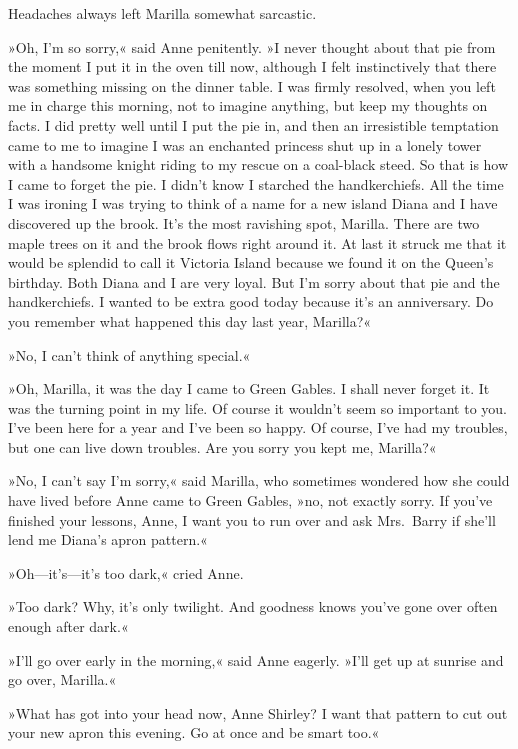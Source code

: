 Headaches always left Marilla somewhat sarcastic.

»Oh, I'm so sorry,« said Anne penitently. »I never thought about that pie from the moment I put it in the oven till now, although I felt instinctively that there was something missing on the dinner table. I was firmly resolved, when you left me in charge this morning, not to imagine anything, but keep my thoughts on facts. I did pretty well until I put the pie in, and then an irresistible temptation came to me to imagine I was an enchanted princess shut up in a lonely tower with a handsome knight riding to my rescue on a coal-black steed. So that is how I came to forget the pie. I didn't know I starched the handkerchiefs. All the time I was ironing I was trying to think of a name for a new island Diana and I have discovered up the brook. It's the most ravishing spot, Marilla. There are two maple trees on it and the brook flows right around it. At last it struck me that it would be splendid to call it Victoria Island because we found it on the Queen's birthday. Both Diana and I are very loyal. But I'm sorry about that pie and the handkerchiefs. I wanted to be extra good today because it's an anniversary. Do you remember what happened this day last year, Marilla?«

»No, I can't think of anything special.«

»Oh, Marilla, it was the day I came to Green Gables. I shall never forget it. It was the turning point in my life. Of course it wouldn't seem so important to you. I've been here for a year and I've been so happy. Of course, I've had my troubles, but one can live down troubles. Are you sorry you kept me, Marilla?«

»No, I can't say I'm sorry,« said Marilla, who sometimes wondered how she could have lived before Anne came to Green Gables, »no, not exactly sorry. If you've finished your lessons, Anne, I want you to run over and ask Mrs.~Barry if she'll lend me Diana's apron pattern.«

»Oh—it's—it's too dark,« cried Anne.

»Too dark? Why, it's only twilight. And goodness knows you've gone over often enough after dark.«

»I'll go over early in the morning,« said Anne eagerly. »I'll get up at sunrise and go over, Marilla.«

»What has got into your head now, Anne Shirley? I want that pattern to cut out your new apron this evening. Go at once and be smart too.«

